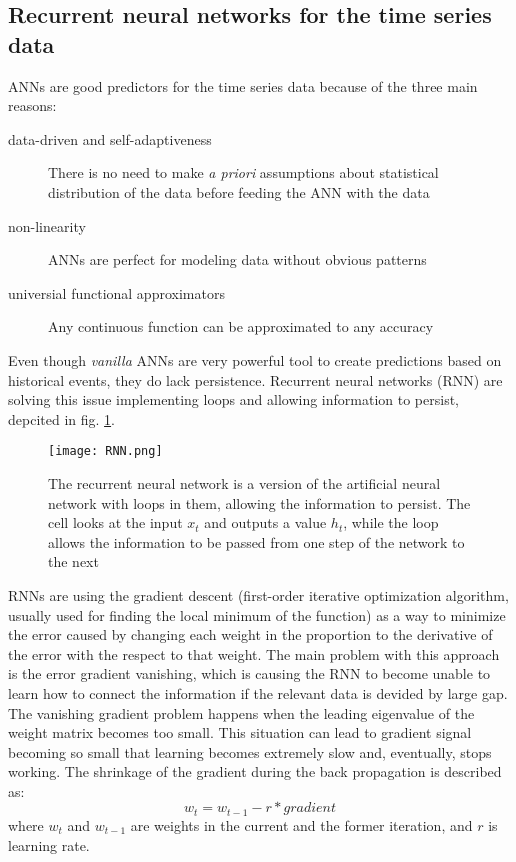 \subsection{Recurrent neural networks for the time series data}
ANNs are good predictors for the time series data because of the three main reasons:
\begin{description}
    \item[data-driven and self-adaptiveness] There is no need to make \textit{a priori} assumptions about statistical distribution of the data before feeding the ANN with the data \cite{Adhikari_timeseries}
    \item[non-linearity] ANNs are perfect for modeling data without obvious patterns  \cite{Zhang_ANN}
    \item[universial functional approximators] Any continuous function can be approximated to any accuracy \cite{Hornik_ANN}  
\end{description}

Even though \textit{vanilla} ANNs are very powerful tool to create predictions based on historical events, they do lack persistence. 
Recurrent neural networks (RNN) are solving this issue implementing loops and allowing information to persist, depcited in fig. \ref{fig:rnn}.
\begin{figure}[h]
    \centering
    \texttt{[image: RNN.png]}
    \caption{The recurrent neural network is a version of the artificial neural network with loops in them, allowing the information to persist. The cell looks at the input $x_{t}$ and outputs a value $h_{t}$, while the loop allows the information to be passed from one step of the network to the next \cite{Olah_LSTM}}
    \label{fig:rnn}
\end{figure}

RNNs are using the gradient descent (first-order iterative optimization algorithm, usually used for finding the local minimum of the function) as a way to minimize the error caused by changing each weight in the proportion to the derivative of the error with the respect to that weight.
The main problem with this approach is the error gradient vanishing, which is causing the RNN to become unable to learn how to connect the information if the relevant data is devided by large gap.
The vanishing gradient problem happens when the leading eigenvalue of the weight matrix becomes too small. 
This situation can lead to gradient signal becoming so small that learning becomes extremely slow and, eventually, stops working.
The shrinkage of the gradient during the back propagation is described as:
$$ w_{t} = w_{t-1} - r * gradient $$
where $w_{t}$ and $w_{t-1}$ are weights in the current and the former iteration, and $r$ is learning rate.

